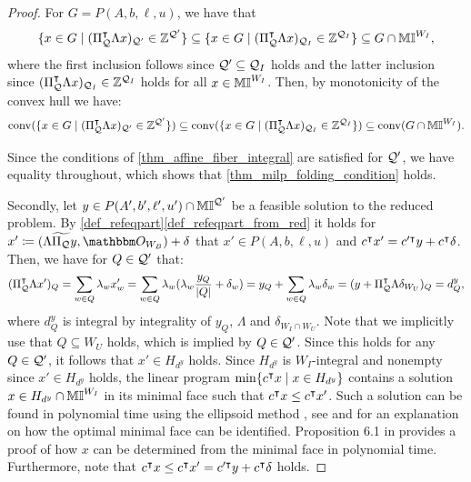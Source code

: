 \documentclass[pdflatex,sn-mathphys-num]{sn-jnl}%
\theoremstyle{thmstyleone}%
\theoremstyle{thmstylethree}%
\theoremstyle{thmstyletwo}%
\newcommand{\conv}{\mathrm{conv}}
\begin{document}
\begin{proof}
    For $G=P(A,b,\ell,u)$, we have that
    \begin{equation*}
        \{x\in G \mid (\Pi_{\mathcal{Q}}^{\intercal} \Lambda x)_{\mathcal{Q}'} \in \mathbb{Z}^{\mathcal{Q}'}\} \subseteq \{x\in G \mid (\Pi_{\mathcal{Q}}^{\intercal} \Lambda x)_{\mathcal{Q}_I} \in \mathbb{Z}^{\mathcal{Q}_I}\} \subseteq G \cap \mathbb{MI}^{W_I},
    \end{equation*}
    where the first inclusion follows since $\mathcal{Q}'\subseteq \mathcal{Q}_I$ holds and the latter inclusion since $(\Pi_{\mathcal{Q}}^{\intercal} \Lambda x)_{\mathcal{Q}_I} \in \mathbb{Z}^{\mathcal{Q}_I}$ holds for all $x\in \mathbb{MI}^{W_I}$. Then, by monotonicity of the convex hull we have: 
    \begin{equation*}
        \conv(\{x\in G \mid (\transpose{\Pi_\MQ} \Lambda x)_{\MQ'} \in \Z^{\MQ'}\}) \subseteq \conv(\{x\in G \mid (\transpose{\Pi_\MQ} \Lambda x)_{\MQ_I} \in \Z^{\MQ_I}\}) \subseteq \conv(G\cap \M^{W_I}).
    \end{equation*}
    
    Since the conditions of \cref{thm_affine_fiber_integral} are satisfied for $\mathcal{Q}'$, we have equality throughout, which shows that \eqref{thm_milp_folding_condition} holds.
   
   Secondly, let $y\in P(A',b',\ell',u')\cap \mathbb{MI}^{\mathcal{Q}'}$ be a feasible solution to the reduced problem. By \cref{def_refeqpart}\ref{def_refeqpart_from_red} it holds for 
    $x' \coloneqq (\Lambda \widetilde{\Pi_\MQ} y,\zerovec_{W_B}) + \delta$  that $x'\in P(A,b,\ell, u)$ and $c^{\intercal} x' = c'^{\intercal} y + c^{\intercal} \delta $. 
    Then, we have for $Q\in \mathcal{Q}'$ that:
    \begin{equation*}
        (\Pi_{\mathcal{Q}}^{\intercal} \Lambda x')_Q = \sum_{w\in Q} \lambda_w x'_w = \sum_{w\in Q} \lambda_w (\lambda_w \frac{y_Q}{|Q|} + \delta_w) = y_Q + \sum_{w\in Q} \lambda_w \delta_w = (y + \Pi_{\mathcal{Q}}^{\intercal} \Lambda \delta_{W_U})_{Q} = d^y_{Q},
    \end{equation*} where $d^y_Q$ is integral by integrality of $y_Q$, $\Lambda$ and $\delta_{W_I\cap W_U}$.
    Note that we implicitly use that $Q\subseteq W_U$ holds, which is implied by $Q\in \mathcal{Q}'$.
    Since this holds for any $Q\in \mathcal{Q}'$, it follows that $x'\in H_{d^y}$ holds. Since $H_{d^y}$ is $W_I$-integral and nonempty since $x'\in H_{d^y}$ holds, the linear program $\min\{c^{\intercal} x \mid x \in H_{d^y}\}$ contains a solution $x\in H_{d^y}\cap \mathbb{MI}^{W_I}$ in its minimal face such that $c^{\intercal} x \leq c^{\intercal} x'$. Such a solution can be found in polynomial time using the ellipsoid method \cite{Khachiyan1980}, see \cite{Grotschel1981} and \cite{Bland1981} for an explanation on how the optimal minimal face can be identified.
    Proposition 6.1 in \cite{VanDerHulst2025} provides a proof of how $x$ can be determined from the minimal face in polynomial time. Furthermore, note that $c^{\intercal} x \leq c^{\intercal} x' = c'^{\intercal} y + c^{\intercal} \delta$ holds. 


\end{proof}
\end{document}
